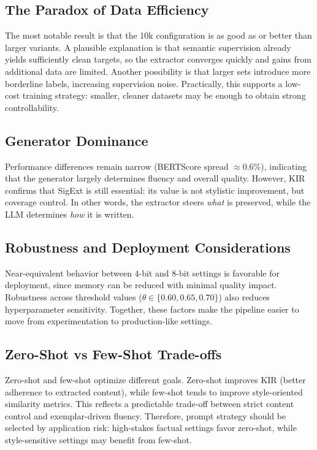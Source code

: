 \documentclass[conference]{IEEEtran}
\begin{document}
\subsection{The Paradox of Data Efficiency}
The most notable result is that the 10k configuration is as good as or better than larger variants. A plausible explanation is that semantic supervision already yields sufficiently clean targets, so the extractor converges quickly and gains from additional data are limited. Another possibility is that larger sets introduce more borderline labels, increasing supervision noise. Practically, this supports a low-cost training strategy: smaller, cleaner datasets may be enough to obtain strong controllability.

\subsection{Generator Dominance}
Performance differences remain narrow (BERTScore spread \(\approx 0.6\%\)), indicating that the generator largely determines fluency and overall quality. However, KIR confirms that SigExt is still essential: its value is not stylistic improvement, but coverage control. In other words, the extractor steers \textit{what} is preserved, while the LLM determines \textit{how} it is written.

\subsection{Robustness and Deployment Considerations}
Near-equivalent behavior between 4-bit and 8-bit settings is favorable for deployment, since memory can be reduced with minimal quality impact. Robustness across threshold values ($\theta \in \{0.60, 0.65, 0.70\}$) also reduces hyperparameter sensitivity. Together, these factors make the pipeline easier to move from experimentation to production-like settings.

\subsection{Zero-Shot vs Few-Shot Trade-offs}
Zero-shot and few-shot optimize different goals. Zero-shot improves KIR (better adherence to extracted content), while few-shot tends to improve style-oriented similarity metrics. This reflects a predictable trade-off between strict content control and exemplar-driven fluency. Therefore, prompt strategy should be selected by application risk: high-stakes factual settings favor zero-shot, while style-sensitive settings may benefit from few-shot.
\end{document}
